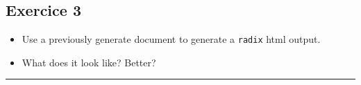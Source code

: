 \documentclass[]{article}
\begin{document}
\hypertarget{exercice-3}{%
\subsection{Exercice 3}\label{exercice-3}}

\begin{itemize}
\item
  Use a previously generate document to generate a \texttt{radix} html
  output.
\item
  What does it look like? Better?
\end{itemize}

\begin{center}\rule{0.5\linewidth}{\linethickness}\end{center}
\end{document}
